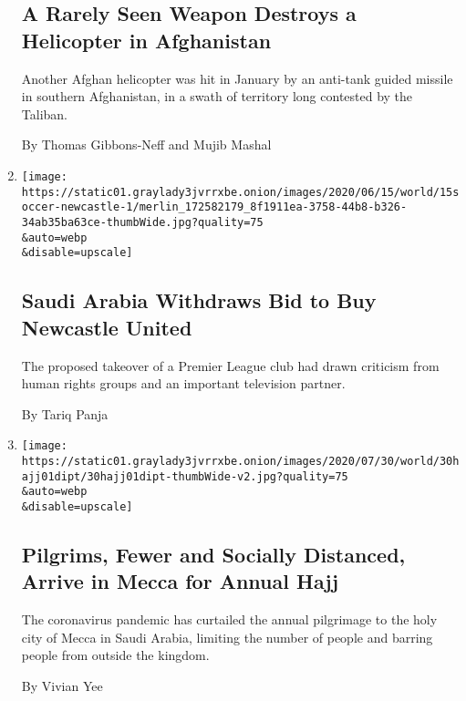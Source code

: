 \begin{enumerate}
  \hypertarget{a-rarely-seen-weapon-destroys-a-helicopter-in-afghanistan}{%
  \subsection{A Rarely Seen Weapon Destroys a Helicopter in
  Afghanistan}\label{a-rarely-seen-weapon-destroys-a-helicopter-in-afghanistan}}

  Another Afghan helicopter was hit in January by an anti-tank guided
  missile in southern Afghanistan, in a swath of territory long
  contested by the Taliban.

  By Thomas Gibbons-Neff and Mujib Mashal
\item
  \href{/2020/07/30/sports/soccer/saudi-arabia-newcastle-united.html}{}

  \texttt{[image: https://static01.graylady3jvrrxbe.onion/images/2020/06/15/world/15soccer-newcastle-1/merlin\_172582179\_8f1911ea-3758-44b8-b326-34ab35ba63ce-thumbWide.jpg?quality=75\\\&auto=webp\\\&disable=upscale]}

  \hypertarget{saudi-arabia-withdraws-bid-to-buy-newcastle-united}{%
  \subsection{Saudi Arabia Withdraws Bid to Buy Newcastle
  United}\label{saudi-arabia-withdraws-bid-to-buy-newcastle-united}}

  The proposed takeover of a Premier League club had drawn criticism
  from human rights groups and an important television partner.

  By Tariq Panja
\item
  \href{/2020/07/30/world/middleeast/pilgrims-hajj-mecca-coronavirus-pandemic.html}{}

  \texttt{[image: https://static01.graylady3jvrrxbe.onion/images/2020/07/30/world/30hajj01dipt/30hajj01dipt-thumbWide-v2.jpg?quality=75\\\&auto=webp\\\&disable=upscale]}

  \hypertarget{pilgrims-fewer-and-socially-distanced-arrive-in-mecca-for-annual-hajj}{%
  \subsection{Pilgrims, Fewer and Socially Distanced, Arrive in Mecca
  for Annual
  Hajj}\label{pilgrims-fewer-and-socially-distanced-arrive-in-mecca-for-annual-hajj}}

  The coronavirus pandemic has curtailed the annual pilgrimage to the
  holy city of Mecca in Saudi Arabia, limiting the number of people and
  barring people from outside the kingdom.

  By Vivian Yee
\end{enumerate}

